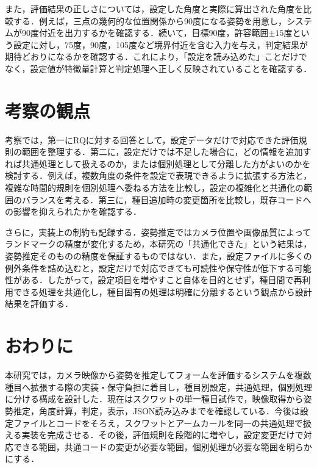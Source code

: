 \documentclass[no-page-number]{nanzan-abstract}
\begin{document}
また，評価結果の正しさについては，設定した角度と実際に算出された角度を比較する．例えば，三点の幾何的な位置関係から90度になる姿勢を用意し，システムが90度付近を出力するかを確認する．続いて，目標90度，許容範囲$\pm15$度という設定に対し，75度，90度，105度など境界付近を含む入力を与え，判定結果が期待どおりになるかを確認する．これにより，「設定を読み込めた」ことだけでなく，設定値が特徴量計算と判定処理へ正しく反映されていることを確認する．

\section{考察の観点}
考察では，第一にRQに対する回答として，設定データだけで対応できた評価規則の範囲を整理する．第二に，設定だけでは不足した場合に，どの情報を追加すれば共通処理として扱えるのか，または個別処理として分離した方がよいのかを検討する．例えば，複数角度の条件を設定で表現できるように拡張する方法と，複雑な時間的規則を個別処理へ委ねる方法を比較し，設定の複雑化と共通化の範囲のバランスを考える．第三に，種目追加時の変更箇所を比較し，既存コードへの影響を抑えられたかを確認する．
\par
さらに，実装上の制約も記録する．姿勢推定ではカメラ位置や画像品質によってランドマークの精度が変化するため，本研究の「共通化できた」という結果は，姿勢推定そのものの精度を保証するものではない．また，設定ファイルに多くの例外条件を詰め込むと，設定だけで対応できても可読性や保守性が低下する可能性がある．したがって，設定項目を増やすこと自体を目的とせず，種目間で再利用できる処理を共通化し，種目固有の処理は明確に分離するという観点から設計結果を評価する．

\section{おわりに}
本研究では，カメラ映像から姿勢を推定してフォームを評価するシステムを複数種目へ拡張する際の実装・保守負担に着目し，種目別設定，共通処理，個別処理に分ける構成を設計した．現在はスクワットの単一種目試作で，映像取得から姿勢推定，角度計算，判定，表示，JSON読み込みまでを確認している．今後は設定ファイルとコードをそろえ，スクワットとアームカールを同一の共通処理で扱える実装を完成させる．その後，評価規則を段階的に増やし，設定変更だけで対応できる範囲，共通コードの変更が必要な範囲，個別処理が必要な範囲を明らかにする．
\end{document}
